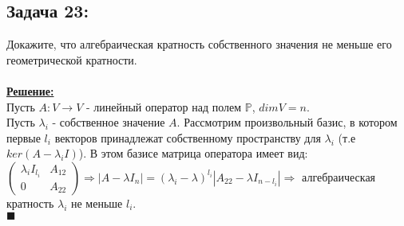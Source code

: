 \documentclass[a4paper,12pt,titlepage,final]{article}
\begin{document}
\subsection*{Задача 23:}
\noindent Докажите, что алгебраическая кратность собственного значения не меньше его геометрической кратности. \\ \\
\textbf{\underline{Решение:}} \\
Пусть $A: V \rightarrow V$ - линейный оператор над полем $\mathbb{P}$, $dimV = n$. \\
Пусть $\lambda_i$ - собственное значение $A$. Рассмотрим произвольный базис, в котором первые 
$l_i$ векторов принадлежат собственному пространству для $\lambda_i$ (т.е $ker(A - \lambda_i I)$).
В этом базисе матрица оператора имеет вид:
$
\begin{pmatrix}
    \lambda_i I_{l_i} & A_{12} \\
    0 & A_{22}
\end{pmatrix} \Rightarrow |A - \lambda I_n| = 
(\lambda_i - \lambda)^{l_i} |A_{22} - \lambda I_{n - l_i}| \Rightarrow$ алгебраическая кратность $\lambda_i$ не меньше $l_i$. \\ $\blacksquare$ \\ \\ \\


\end{document}
